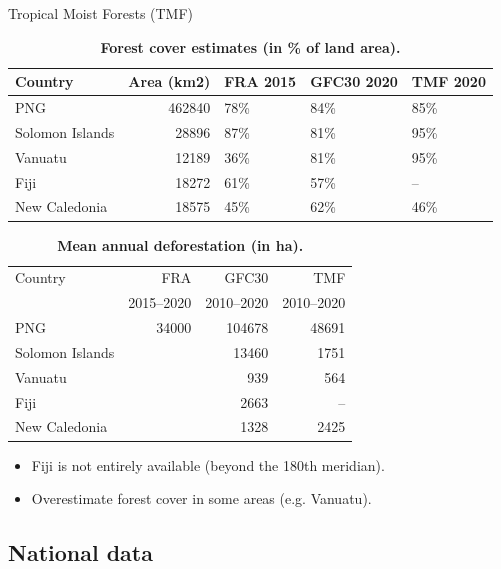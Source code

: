 \documentclass[10pt,table,dvipsnames,compress]{beamer}
\begin{document}
\begin{frame}[label={sec:orgebfa21a}]{Tropical Moist Forests (TMF)}
\begin{table}[htbp]
\caption{\textbf{Forest cover estimates (in \% of land area).}}
\centering
\footnotesize
\begin{tabular}{lrlll}
Country & Area (km2) & FRA 2015 & GFC30 2020 & TMF 2020\\[0pt]
\hline
PNG & 462840 & 78\% & 84\% & 85\%\\[0pt]
Solomon Islands & 28896 & 87\% & 81\% & 95\%\\[0pt]
Vanuatu & 12189 & 36\% & 81\% & 95\%\\[0pt]
Fiji & 18272 & 61\% & 57\% & --\\[0pt]
New Caledonia & 18575 & 45\% & 62\% & 46\%\\[0pt]
\end{tabular}
\end{table}

\begin{table}[htbp]
\caption{\textbf{Mean annual deforestation (in ha).}}
\centering
\footnotesize
\begin{tabular}{lrrr}
Country & FRA & GFC30 & TMF\\[0pt]
 & 2015--2020 & 2010--2020 & 2010--2020\\[0pt]
\hline
PNG & 34000 & 104678 & 48691\\[0pt]
Solomon Islands &  & 13460 & 1751\\[0pt]
Vanuatu &  & 939 & 564\\[0pt]
Fiji &  & 2663 & --\\[0pt]
New Caledonia &  & 1328 & 2425\\[0pt]
\end{tabular}
\end{table}

\begin{itemize}
\item Fiji is not entirely available (beyond the 180th meridian).
\item Overestimate forest cover in some areas (e.g. Vanuatu).
\end{itemize}
\end{frame}

\subsection{National data}
\label{sec:orgea36834}
\end{document}
